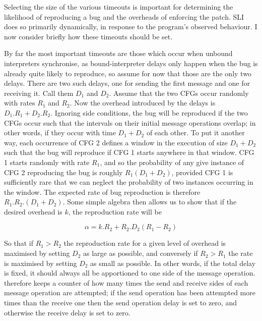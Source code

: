 
Selecting the size of the various timeouts is important for
determining the likelihood of reproducing a bug and the overheads of
enforcing the patch.  SLI does so primarily dynamically, in response
to the program's observed behaviour.  I now consider briefly how these
timeouts should be set.

By far the most important timeouts are those which occur when unbound
interpreters synchronise, as bound-interpreter delays only happen when
the bug is already quite likely to reproduce, so
assume for now that those are the only two delays.  There are two such
delays, one for sending the first message and one for receiving it.
Call them $D_1$ and $D_2$.  Assume that the two CFGs occur randomly
with rates $R_1$ and $R_2$.  Now the overhead introduced by the delays
is $D_1.R_1 + D_2.R_2$.  Ignoring side conditions, the bug will be
reproduced if the two CFGs occur such that the intervals on their
initial message operations overlap; in other words, if they occur with
time $D_1 + D_2$ of each other.  To put it another way, each
occurrence of CFG 2 defines a window in the execution of size $D_1 +
D_2$ such that the bug will reproduce if CFG 1 starts anywhere in that
window.  CFG 1 starts randomly with rate $R_1$, and so the probability
of any give instance of CFG 2 reproducing the bug is roughly $R_1(D_1
+ D_2)$, provided CFG 1 is sufficiently rare that we can neglect the
probability of two instances occurring in the window.  The expected
rate of bug reproduction is therefore $R_1.R_2.(D_1+D_2)$.  Some
simple algebra then allows us to show that if the desired overhead is
$k$, the reproduction rate will be

\begin{displaymath}
\alpha = k.R_2 + R_2.D_2(R_1 - R_2)
\end{displaymath}

So that if $R_1 > R_2$ the reproduction rate for a given level of
overhead is maximised by setting $D_2$ as large as possible, and
conversely if $R_2 > R_1$ the rate is maximised by setting $D_2$ as
small as possible.  In other words, if the total delay is fixed, it
should always all be apportioned to one side of the message operation.
{\Technique} therefore keeps a counter of how many times the send and
receive sides of each message operation are attempted; if the send
operation has been attempted more times than the receive one then the
send operation delay is set to zero, and otherwise the receive delay
is set to zero.

